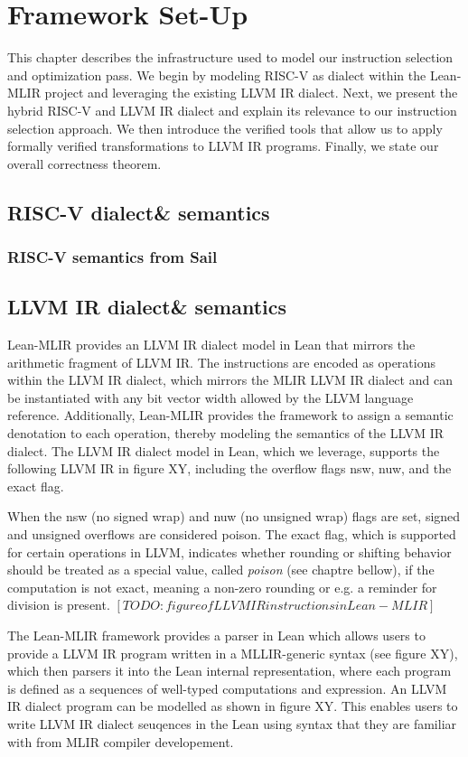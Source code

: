 \chapter{Framework Set-Up}
This chapter describes the infrastructure used to model our instruction selection and optimization pass. We begin by modeling RISC-V as dialect within the Lean-MLIR project and leveraging the existing LLVM IR dialect. Next, we present the hybrid RISC-V and LLVM IR dialect and explain its relevance to our instruction selection approach. We then introduce the verified tools that allow us to apply formally verified transformations to LLVM IR programs. Finally, we state our overall correctness theorem.

\section{RISC-V dialect\& semantics}
\subsection{ RISC-V semantics from Sail}

\section{LLVM IR dialect\& semantics}

Lean-MLIR provides an LLVM IR dialect model in Lean that mirrors the arithmetic fragment of LLVM IR. The instructions are encoded as operations within the LLVM IR dialect, which mirrors the MLIR LLVM IR dialect and can be instantiated with any bit vector width allowed by the LLVM language reference. Additionally, Lean-MLIR provides the framework to assign a semantic denotation to each operation, thereby modeling the semantics of the LLVM IR dialect. The LLVM IR dialect model in Lean, which we leverage, supports the following LLVM IR in figure XY, including the overflow flags nsw, nuw, and the exact flag. 

When the nsw (no signed wrap) and nuw (no unsigned wrap) flags are set, signed and unsigned overflows are considered poison. The exact flag, which is supported for certain operations in LLVM, indicates whether rounding or shifting behavior should be treated as a special value, called \textit{poison} (see chaptre bellow), if the computation is not exact, meaning a non-zero rounding or e.g. a reminder for division is present.
$[TO DO: figure of LLVM IR instructions in Lean-MLIR]$

The Lean-MLIR framework provides a parser in Lean which allows users to provide a LLVM IR program written in a MLLIR-generic syntax (see figure XY), which then parsers it into the Lean internal representation, where each program is defined as a sequences of well-typed computations and expression. An LLVM IR dialect program can be modelled as shown in figure XY. This enables users to write LLVM IR dialect seuqences in the Lean using syntax that they are familiar with from MLIR compiler developement. 

